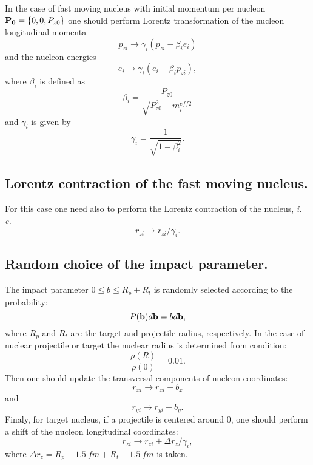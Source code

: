 \hspace{1.0em}In the case of fast moving nucleus with initial momentum
per nucleon ${\bf P_0}= \{0, 0, P_{z0}\}$ one should perform Lorentz
transformation of the nucleon longitudinal momenta
\begin{equation}
\label{KNIS9}  p_{zi} \rightarrow \gamma_i (p_{zi} - \beta_i e_{i})
\end{equation}
and the nucleon energies 
\begin{equation}
\label{KNIS10} e_{i} \rightarrow \gamma_i (e_{i} - \beta_i p_{zi}),
\end{equation}
where $\beta_{i}$ is defined as
\begin{equation}
\label{KNIS11} \beta_{i} = \frac{P_{z0}}{\sqrt{P_{z0}^2 + m^{eff2}_i}}
\end{equation}
and $\gamma_i$ is given by 
\begin{equation}
\label{KNIS12}\gamma_i = \frac{1}{\sqrt{1 - \beta_i^2}}.
\end{equation}

\subsection{Lorentz contraction of the fast moving nucleus.}
\hspace{1.0em}For this case one need also to perform the Lorentz
contraction of the nucleus, \textit{i. e.}
\begin{equation}
\label{KNIS13} r_{zi} \rightarrow r_{zi}/ \gamma_{i}.
\end{equation}
\subsection{Random choice of the impact parameter.}

\hspace{1.0em}The impact parameter $0 \leq b \leq R_p + R_t$ is randomly
selected according to the probability:
\begin{equation}
\label{KNIS14}P({\bf b})d{\bf b} = b d{\bf b},
\end{equation}
where $R_p$ and $R_t$ are the target and projectile radius,
respectively. In the case of nuclear projectile or target the nuclear radius is
determined from condition:
\begin{equation}
\label{KNIS15}\frac{\rho(R)}{\rho(0)} = 0.01.
\end{equation}
 Then one should update the transversal components of
nucleon coordinates:
\begin{equation}
\label{KNIS16} r_{xi} \rightarrow r_{xi} + b_x
\end{equation}
and
\begin{equation}
\label{KNIS17} r_{yi} \rightarrow r_{yi} + b_y.
\end{equation}
Finaly, for target nucleus, if a projectile is centered around $0$, one
should perform a shift of the nucleon longitudinal coordinates:
\begin{equation}
\label{KNIS18} r_{zi} \rightarrow r_{zi} + \Delta r_z/\gamma_{i},
\end{equation}
where $\Delta r_z = R_p + 1.5 \ fm + R_t + 1.5 \ fm$ is taken.

